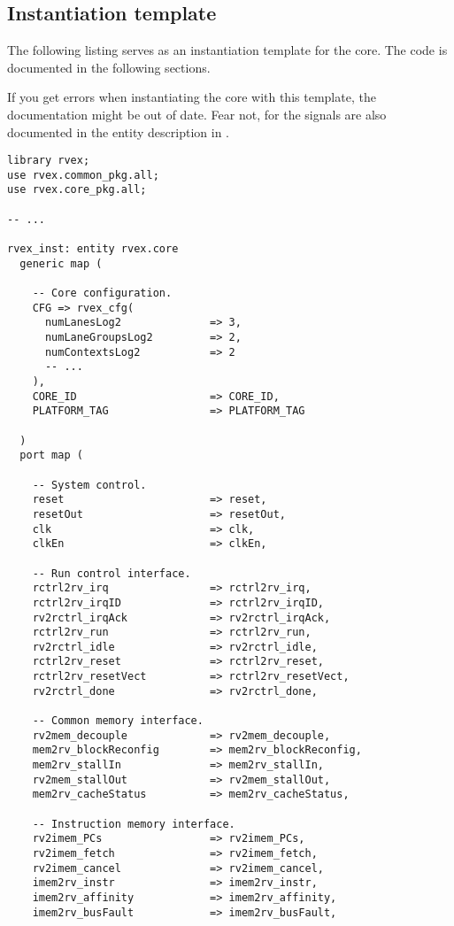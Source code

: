 \subsection{Instantiation template}
\label{sec:core-ug-inst-template}

The following listing serves as an instantiation template for the core. The code
is documented in the following sections.

If you get errors when instantiating the core with this template, the
documentation might be out of date. Fear not, for the signals are also
documented in the entity description in .

\begin{lstlisting}[numbers=none, basicstyle=\tiny]
library rvex;
use rvex.common_pkg.all;
use rvex.core_pkg.all;

-- ...

rvex_inst: entity rvex.core
  generic map (
    
    -- Core configuration.
    CFG => rvex_cfg(
      numLanesLog2              => 3,
      numLaneGroupsLog2         => 2,
      numContextsLog2           => 2
      -- ...
    ),
    CORE_ID                     => CORE_ID,
    PLATFORM_TAG                => PLATFORM_TAG
    
  )
  port map (
    
    -- System control.
    reset                       => reset,
    resetOut                    => resetOut,
    clk                         => clk,
    clkEn                       => clkEn,
    
    -- Run control interface.
    rctrl2rv_irq                => rctrl2rv_irq,
    rctrl2rv_irqID              => rctrl2rv_irqID,
    rv2rctrl_irqAck             => rv2rctrl_irqAck,
    rctrl2rv_run                => rctrl2rv_run,
    rv2rctrl_idle               => rv2rctrl_idle,
    rctrl2rv_reset              => rctrl2rv_reset,
    rctrl2rv_resetVect          => rctrl2rv_resetVect,
    rv2rctrl_done               => rv2rctrl_done,
    
    -- Common memory interface.
    rv2mem_decouple             => rv2mem_decouple,
    mem2rv_blockReconfig        => mem2rv_blockReconfig,
    mem2rv_stallIn              => mem2rv_stallIn,
    rv2mem_stallOut             => rv2mem_stallOut,
    mem2rv_cacheStatus          => mem2rv_cacheStatus,
    
    -- Instruction memory interface.
    rv2imem_PCs                 => rv2imem_PCs,
    rv2imem_fetch               => rv2imem_fetch,
    rv2imem_cancel              => rv2imem_cancel,
    imem2rv_instr               => imem2rv_instr,
    imem2rv_affinity            => imem2rv_affinity,
    imem2rv_busFault            => imem2rv_busFault,
    

\end{lstlisting}
